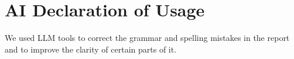 \section{AI Declaration of Usage}
We used LLM tools to correct the grammar and spelling 
mistakes in the report and to improve the clarity of certain parts 
of it.
